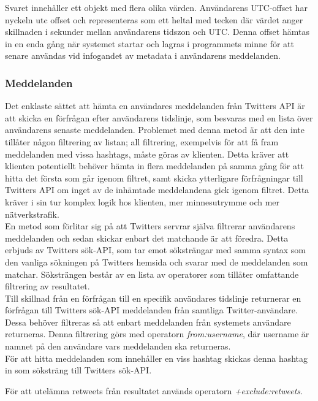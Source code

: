 \documentclass[a4paper,11pt]{article}
\begin{document}
Svaret innehåller ett objekt med flera olika värden. Användarens UTC-offset har nyckeln utc \textunderscore offset och representeras som ett heltal med tecken där värdet anger skillnaden i sekunder mellan användarens tidszon och UTC. Denna offset hämtas in en enda gång när systemet startar och lagras i programmets minne för att senare användas vid infogandet av metadata i användarens meddelanden.

\subsubsection{Meddelanden}
Det enklaste sättet att hämta en användares meddelanden från Twitters API är att skicka en förfrågan efter användarens tidslinje, som besvaras med en lista över användarens senaste meddelanden. Problemet med denna metod är att den inte tillåter någon filtrering av listan; all filtrering, exempelvis för att få fram meddelanden med vissa hashtags, måste göras av klienten. Detta kräver att klienten potentiellt behöver hämta in flera meddelanden på samma gång för att hitta det första som går igenom filtret, samt skicka ytterligare förfrågningar till Twitters API om inget av de inhämtade meddelandena gick igenom filtret. Detta kräver i sin tur komplex logik hos klienten, mer minnesutrymme och mer nätverkstrafik. \\

En metod som förlitar sig på att Twitters servrar själva filtrerar användarens meddelanden och sedan skickar enbart det matchande är att föredra. Detta erbjuds av Twitters sök-API, som tar emot söksträngar med samma syntax som den vanliga sökningen på Twitters hemsida och svarar med de meddelanden som matchar. Söksträngen består av en lista av operatorer som tillåter omfattande filtrering av resultatet. \\

Till skillnad från en förfrågan till en specifik användares tidslinje returnerar en förfrågan till Twitters sök-API meddelanden från samtliga Twitter-användare. Dessa behöver filtreras så att enbart meddelanden från systemets användare returneras. Denna filtrering görs med operatorn {\it from:username}, där username är namnet på den användare vars meddelanden ska returneras. \\

För att hitta meddelanden som innehåller en viss hashtag skickas denna hashtag in som söksträng till Twitters sök-API.

För att utelämna retweets från resultatet används operatorn {\it +exclude:retweets}.
\end{document}
